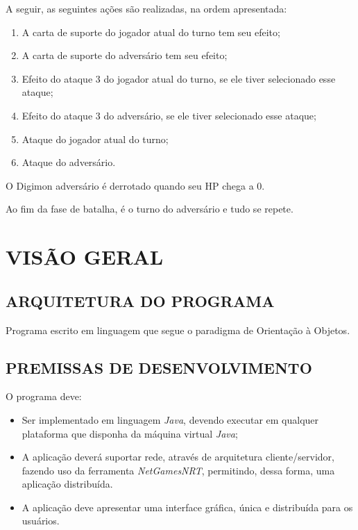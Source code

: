\documentclass[12pt,a4paper,brazil,abntex2]{article}
\begin{document}
\begin{enumerate}
					A seguir, as seguintes ações são realizadas, na ordem apresentada:
						\begin{enumerate}
							\item A carta de suporte do jogador atual do turno tem seu efeito;
							\item A carta de suporte do adversário tem seu efeito;
							\item Efeito do ataque 3 do jogador atual do turno, se ele tiver selecionado esse ataque;
							\item Efeito do ataque 3 do adversário, se ele tiver selecionado esse ataque;
							\item Ataque do jogador atual do turno;
							\item Ataque do adversário.
						\end{enumerate}

					O Digimon adversário é derrotado quando seu HP chega a 0.

					Ao fim da fase de batalha, é o turno do adversário e tudo se repete.
			\end{enumerate}
			
\newpage

\section{\normalsize VISÃO GERAL}
	\subsection{\normalsize ARQUITETURA DO PROGRAMA}

		Programa escrito em linguagem que segue o paradigma de Orientação à Objetos.
	
	\subsection{\normalsize PREMISSAS DE DESENVOLVIMENTO}
		
		O programa deve:		
		\begin{itemize}
			\item Ser implementado em linguagem \textit{Java}, devendo executar em qualquer plataforma que disponha da máquina virtual \textit{Java};
			\item A aplicação deverá suportar rede, através de arquitetura cliente/servidor, fazendo uso da ferramenta \textit{NetGamesNRT}, permitindo, dessa forma, uma aplicação distribuída.
			\item A aplicação deve apresentar uma interface gráfica, única e distribuída para os usuários.
		\end{itemize}
\newpage
\end{document}
